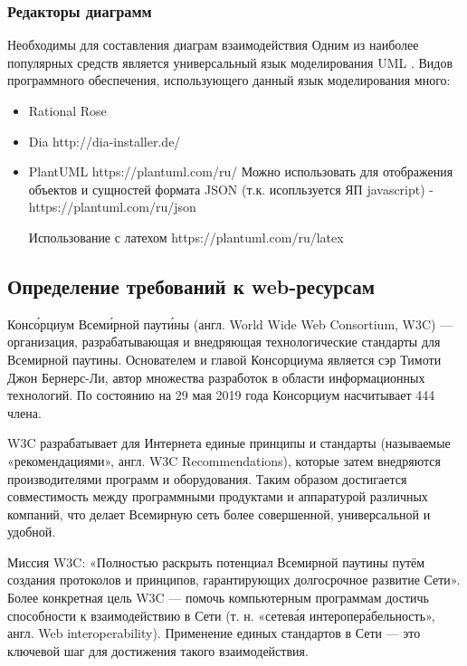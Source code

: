     \subsubsection{Редакторы диаграмм}
        Необходимы для составления диаграм взаимодействия
        Одним из наиболее популярных средств является универсальный язык моделирования UML \cite{wiki-UML}.
        Видов программного обеспечения, использующего данный язык моделирования много:
        \begin{itemize}
            \item Rational Rose
            \item Dia   http://dia-installer.de/
            \item PlantUML  https://plantuml.com/ru/
            Можно использовать для отображения объектов и сущностей формата JSON (т.к. исопльзуется ЯП javascript) - https://plantuml.com/ru/json

            Использование с латехом
            https://plantuml.com/ru/latex

        \end{itemize}

\subsection{Определение требований к web-ресурсам}

    Консо́рциум Всеми́рной паути́ны (англ. World Wide Web Consortium, W3C) — организация, разрабатывающая и внедряющая технологические стандарты для Всемирной паутины. Основателем и главой Консорциума является сэр Тимоти Джон Бернерс-Ли, автор множества разработок в области информационных технологий. По состоянию на 29 мая 2019 года Консорциум насчитывает 444 члена.

    W3C разрабатывает для Интернета единые принципы и стандарты (называемые «рекомендациями», англ. W3C Recommendations), которые затем внедряются производителями программ и оборудования. Таким образом достигается совместимость между программными продуктами и аппаратурой различных компаний, что делает Всемирную сеть более совершенной, универсальной и удобной.

    Миссия W3C: «Полностью раскрыть потенциал Всемирной паутины путём создания протоколов и принципов, гарантирующих долгосрочное развитие Сети».
    Более конкретная цель W3C — помочь компьютерным программам достичь способности к взаимодействию в Сети (т. н. «сетева́я интеропера́бельность», англ. Web interoperability). Применение единых стандартов в Сети — это ключевой шаг для достижения такого взаимодействия.

